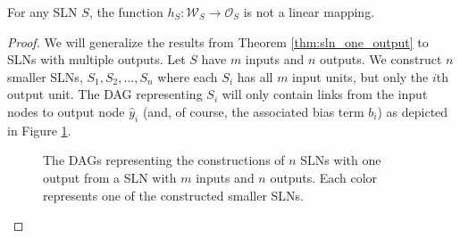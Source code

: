\begin{corollary}
    \label{col:weight_output_sln}
    For any SLN $S$, the function $h_S: \mathcal{W}_S \rightarrow \mathcal{O}_S$ is not a linear mapping.
\end{corollary}
\begin{proof}
    We will generalize the results from Theorem \ref{thm:sln_one_output} to SLNs with multiple outputs.
    Let $S$ have $m$ inputs and $n$ outputs.
    We construct $n$ smaller SLNs, $S_1,S_2,\dots,S_n$ where each $S_i$ has all $m$ input units, but only the $i$th output unit. 
    The DAG representing $S_i$ will only contain links from the input nodes to output node $\hat{y}_i$ (and, of course, the associated bias term $b_i$) as depicted in Figure \ref{fig:sln_m_in_n_out_construction}.
    \begin{figure}
        \begin{center}
        \end{center}
        \caption{The DAGs representing the constructions of $n$ SLNs with one output from a SLN with $m$ inputs and $n$ outputs. Each color represents one of the constructed smaller SLNs.}
        \label{fig:sln_m_in_n_out_construction}
    \end{figure}
    

\end{proof}
